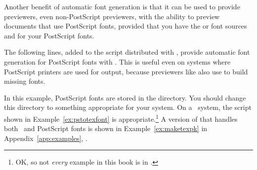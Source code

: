 Another benefit of automatic font generation is that it can be used to
provide previewers, even non-PostScript previewers, with the ability
to preview documents that use PostScript fonts, provided that you have
the  or 
 font sources 
and  for 
your PostScript fonts.

The following lines, added to the  script
distributed with , provide automatic font generation
for PostScript fonts with .  This is useful even on
systems where PostScript printers are used for output, because previewers
like  also use  to build missing
fonts.


In this example, PostScript fonts are stored in the 
 directory.
You should change this directory to something appropriate for your system.
On a \Unix\ system, the  script shown in 
Example~\ref{ex:pstotexfont} is appropriate.\footnote{OK, so not
\emph{every} example in this book is in .}  A 
version of  that handles both \MF\ and PostScript
fonts is shown in Example~\ref{ex:maketexpk} in Appendix~\ref{app:examples}, 
\textit{}.

